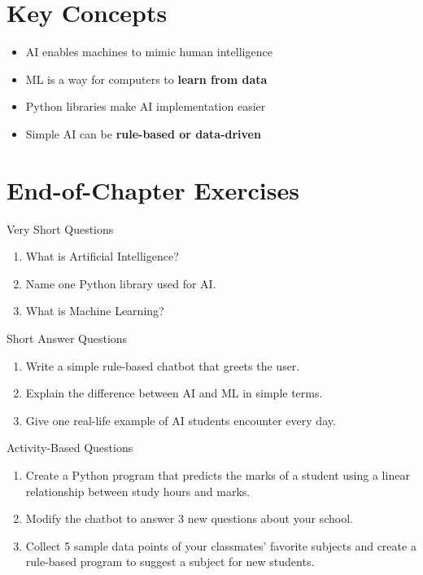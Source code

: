 \section{Key Concepts}

\begin{itemize}
    \item AI enables machines to mimic human intelligence  
    \item ML is a way for computers to \textbf{learn from data}  
    \item Python libraries make AI implementation easier  
    \item Simple AI can be \textbf{rule-based or data-driven}  
\end{itemize}

\section{End-of-Chapter Exercises}

\begin{exercise}{Very Short Questions}
\begin{enumerate}
    \item What is Artificial Intelligence?  
    \item Name one Python library used for AI.  
    \item What is Machine Learning?  
\end{enumerate}
\end{exercise}

\begin{exercise}{Short Answer Questions}
\begin{enumerate}
    \item Write a simple rule-based chatbot that greets the user.  
    \item Explain the difference between AI and ML in simple terms.  
    \item Give one real-life example of AI students encounter every day.  
\end{enumerate}
\end{exercise}

\begin{exercise}{Activity-Based Questions}
\begin{enumerate}
    \item Create a Python program that predicts the marks of a student using a linear relationship between study hours and marks.  
    \item Modify the chatbot to answer 3 new questions about your school.  
    \item Collect 5 sample data points of your classmates’ favorite subjects and create a rule-based program to suggest a subject for new students.  
\end{enumerate}
\end{exercise}

